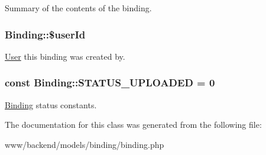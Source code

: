 \label{classBinding_ae960edd7ba2a427c3853936f0e1a380e}
Summary of the contents of the binding. \hypertarget{classBinding_ab62d5639d1a6f658de8a5fda326cc30d}{
\subsubsection[{\$userId}]{\setlength{\rightskip}{0pt plus 5cm}Binding::\$userId}}
\label{classBinding_ab62d5639d1a6f658de8a5fda326cc30d}
\hyperlink{classUser}{User} this binding was created by. \hypertarget{classBinding_a501dc5e8d8952bcbd5d022a299c416fd}{
\subsubsection[{STATUS\_\-UPLOADED}]{\setlength{\rightskip}{0pt plus 5cm}const {\bf Binding::STATUS\_\-UPLOADED} = 0}}
\label{classBinding_a501dc5e8d8952bcbd5d022a299c416fd}
\hyperlink{classBinding}{Binding} status constants. 

The documentation for this class was generated from the following file:\begin{DoxyCompactItemize}
\item 
www/backend/models/binding/binding.php\end{DoxyCompactItemize}
